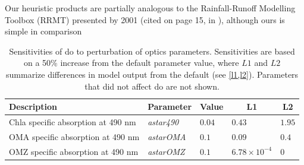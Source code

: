 \documentclass[letterpaper,12pt,oneside]{article}\usepackage[]{graphicx}\usepackage[]{color}
\begin{document}
Our heuristic products are partially analogous to the Rainfall-Runoff Modelling Toolbox (RRMT) presented by \citep{Wagener01b}2001 (cited on page 15, in \citealt{Wagener01}), although ours is simple in comparison

\clearpage
\begin{singlespace}


\end{singlespace}
\clearpage


\begin{table}[!tbp]
{\normalsize
\caption{Sensitivities of \ac{do} to perturbation of optics parameters.  Sensitivities are based on a 50\% increase from the default parameter value, where $L1$ and $L2$ summarize differences in model output from the default (see \cref{l1,l2}).  Parameters that did not affect \ac{do} are not shown.\label{tab:optsens}} 
\begin{center}
\begin{tabular}{lllll}
\hline\hline
\multicolumn{1}{l}{Description}&\multicolumn{1}{c}{Parameter}&\multicolumn{1}{c}{Value}&\multicolumn{1}{c}{L1}&\multicolumn{1}{c}{L2}\tabularnewline
\hline
Chla specific absorption at 490 nm&\textit{astar490}&$0.04$&$0.43$&$1.95$\tabularnewline
OMA specific absorption at 490 nm&\textit{astarOMA}&$0.1$&$0.09$&$0.4$\tabularnewline
OMZ specific absorption at 490 nm&\textit{astarOMZ}&$0.1$&$6.78\times 10^{-4}$&$0$\tabularnewline
\hline
\end{tabular}\end{center}}

\end{table}
\end{document}
